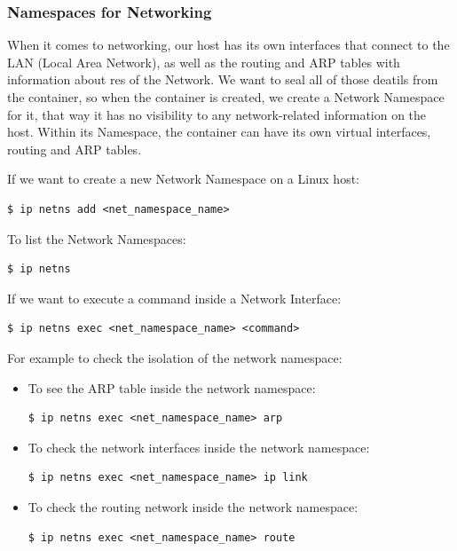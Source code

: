 \documentclass{article}
\newenvironment{codetemplate}[1][]{%
  \mybasecolorbox[#1]
  \itshape
}{%
  \endmybasecolorbox
}
\begin{document}
\subsubsection{Namespaces for Networking}

When it comes to networking, our host has its own interfaces that connect to the LAN (Local Area Network), as well as the routing and ARP tables with information about res of the Network. We want to seal all of those deatils from the container, so when the container is created, we create a Network Namespace for it, that way it has no visibility to any network-related information on the host. Within its Namespace, the container can have its own virtual interfaces, routing and ARP tables.

If we want to create a new Network Namespace on a Linux host:
\begin{codetemplate}{}
\begin{verbatim}
$ ip netns add <net_namespace_name>
\end{verbatim}
\end{codetemplate}

To list the Network Namespaces:
\begin{codetemplate}{}
\begin{verbatim}
$ ip netns
\end{verbatim}
\end{codetemplate}

If we want to execute a command inside a Network Interface:
\begin{codetemplate}{}
\begin{verbatim}
$ ip netns exec <net_namespace_name> <command>
\end{verbatim}
\end{codetemplate}

For example to check the isolation of the network namespace:
\begin{itemize}
    \item To see the ARP table inside the network namespace:
\begin{codetemplate}{}
\begin{verbatim}
$ ip netns exec <net_namespace_name> arp
\end{verbatim}
\end{codetemplate}
    \item To check the network interfaces inside the network namespace:
\begin{codetemplate}{}
\begin{verbatim}
$ ip netns exec <net_namespace_name> ip link
\end{verbatim}
\end{codetemplate}
    \item To check the routing network inside the network namespace:
\begin{codetemplate}{}
\begin{verbatim}
$ ip netns exec <net_namespace_name> route
\end{verbatim}
\end{codetemplate}
\end{itemize}
\end{document}
